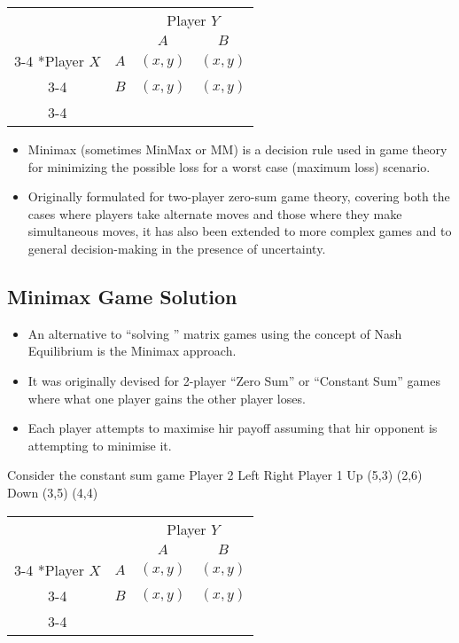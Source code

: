 \documentclass{article}
\begin{document}
  \begin{table}
    \setlength{\extrarowheight}{2pt}
    \begin{tabular}{cc|c|c|}
      & \multicolumn{1}{c}{} & \multicolumn{2}{c}{Player $Y$}\\
      & \multicolumn{1}{c}{} & \multicolumn{1}{c}{$A$}  & \multicolumn{1}{c}{$B$} \\\cline{3-4}
      \multirow{2}*{Player $X$}  & $A$ & $(x,y)$ & $(x,y)$ \\\cline{3-4}
      & $B$ & $(x,y)$ & $(x,y)$ \\\cline{3-4}
    \end{tabular}
  \end{table}


\begin{itemize}
\item Minimax (sometimes MinMax or MM) is a decision rule used in  game theory for minimizing the possible loss for a worst case (maximum loss) scenario. 
\item Originally formulated for two-player zero-sum game theory, covering both the cases where players take alternate moves and those where they make simultaneous moves, it has also been extended to more complex games and to general decision-making in the presence of uncertainty.
\end{itemize}

\subsection{Minimax Game Solution}
\begin{itemize}
\item An alternative to “solving ” matrix games using the concept of Nash Equilibrium is the
Minimax approach. 
\item It was originally devised for 2-player “Zero Sum” or “Constant Sum”
games where what one player gains the other player loses. 
\item Each player attempts to maximise
hir payoff assuming that hir opponent is attempting to minimise it.
\end{itemize}

Consider the constant sum game
Player 2
Left Right
Player 1 Up (5,3) (2,6)
Down (3,5) (4,4)


  \begin{table}
    \setlength{\extrarowheight}{2pt}
    \begin{tabular}{cc|c|c|}
      & \multicolumn{1}{c}{} & \multicolumn{2}{c}{Player $Y$}\\
      & \multicolumn{1}{c}{} & \multicolumn{1}{c}{$A$}  & \multicolumn{1}{c}{$B$} \\\cline{3-4}
      \multirow{2}*{Player $X$}  & $A$ & $(x,y)$ & $(x,y)$ \\\cline{3-4}
      & $B$ & $(x,y)$ & $(x,y)$ \\\cline{3-4}
    \end{tabular}
  \end{table}
\end{document}
